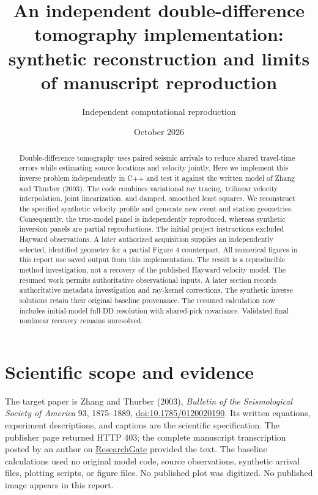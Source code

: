 \documentclass[11pt]{article}
\title{An independent double-difference tomography implementation:\\synthetic reconstruction and limits of manuscript reproduction}
\author{Independent computational reproduction}
\date{October 2026}
\begin{document}
\maketitle
\begin{abstract}
Double-difference tomography uses paired seismic arrivals to reduce shared
travel-time errors while estimating source locations and velocity jointly.
Here we implement this inverse problem independently in C++ and test it
against the written model of Zhang and Thurber (2003). The code combines
variational ray tracing, trilinear velocity interpolation, joint linearization,
and damped, smoothed least squares. We reconstruct the specified synthetic
velocity profile and generate new event and station geometries. Consequently,
the true-model panel is independently reproduced, whereas synthetic inversion
panels are partial reproductions. The initial project instructions excluded
Hayward observations. A later authorized acquisition supplies an independently
selected, identified geometry for a partial Figure 4 counterpart.
All numerical figures in this report use saved output from this implementation.
The result is a reproducible method investigation, not a recovery of the
published Hayward velocity model.
The resumed work permits authoritative observational inputs. A later section
records authoritative metadata investigation and ray-kernel corrections. The
synthetic inverse solutions retain their original baseline provenance.
The resumed calculation now includes initial-model full-DD resolution with
shared-pick covariance. Validated final nonlinear recovery remains unresolved.
\end{abstract}

\section{Scientific scope and evidence}
The target paper is Zhang and Thurber (2003), \emph{Bulletin of the
Seismological Society of America} 93, 1875--1889,
\href{https://doi.org/10.1785/0120020190}{doi:10.1785/0120020190}.
Its written equations, experiment descriptions, and captions are the scientific
specification. The publisher page returned HTTP 403; the complete manuscript
transcription posted by an author on
\href{https://www.researchgate.net/publication/215754286}{ResearchGate}
provided the text. The baseline calculations used no original model code,
source observations, synthetic arrival files, plotting scripts, or figure files.
No published plot was digitized. No published image appears in this report.
\end{document}
